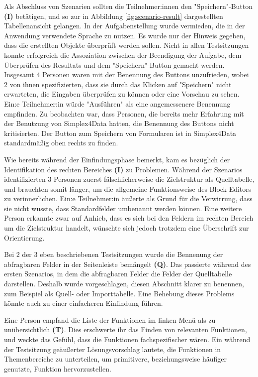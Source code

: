 Als Abschluss von Szenarien sollten die Teilnehmer:innen den "Speichern"-Button \textbf{(I)} betätigen, und so zur in Abbildung \ref{fig:scenario-result} dargestellten Tabellenansicht gelangen. In der Aufgabenstellung wurde vermieden, die in der Anwendung verwendete Sprache zu nutzen. Es wurde nur der Hinweis gegeben, dass die erstellten Objekte überprüft werden sollen. Nicht in allen Testsitzungen konnte erfolgreich die Assoziation zwischen der Beendigung der Aufgabe, dem Überprüfen des Resultats und dem "Speichern"-Button gemacht  werden. Insgesamt 4 Personen waren mit der Benennung des Buttons unzufrieden, wobei 2 von ihnen spezifizierten, dass sie durch das Klicken auf "Speichern" nicht erwarteten, die Eingaben überprüfen zu können oder eine Vorschau zu sehen. Ein:e Teilnehmer:in würde "Ausführen" als eine angemessenere Benennung empfinden. Zu beobachten war, dass Personen, die bereits mehr Erfahrung mit der Benutzung von Simplex4Data hatten, die Benennung des Buttons nicht kritisierten. Der Button zum Speichern von Formularen ist in Simplex4Data standardmäßig oben rechts zu finden.

Wie bereits während der Einfindungsphase bemerkt, kam es bezüglich der Identifikation des rechten Bereiches \textbf{(I)} zu Problemen. Während der Szenarios identifizierten 3 Personen zuerst fälschlicherweise die Zielstruktur als Quelltabelle, und brauchten somit länger, um die allgemeine Funktionsweise des Block-Editors zu verinnerlichen. Ein:e Teilnehmer:in äußerte als Grund für die Verwirrung, dass sie nicht wusste, dass Standardfelder umbenannt werden können. Eine weitere Person erkannte zwar auf Anhieb, dass es sich bei den Feldern im rechten Bereich um die Zielstruktur handelt, wünschte sich jedoch trotzdem eine Überschrift zur Orientierung.

Bei 2 der 3 eben beschriebenen Testsitzungen wurde die Bennenung der abfragbaren Felder in der Seitenleiste bemängelt \textbf{(Q)}. Das passierte während des ersten Szenarios, in dem die abfragbaren Felder die Felder der Quelltabelle darstellen. Deshalb wurde vorgeschlagen, diesen Abschnitt klarer zu benennen, zum Beispiel als Quell- oder Importtabelle. Eine Behebung dieses Problems könnte auch zu einer einfacheren Einfindung führen.

Eine Person empfand die Liste der Funktionen im linken Menü als zu unübersichtlich \textbf{(T)}. Dies erschwerte ihr das Finden von relevanten Funktionen, und weckte das Gefühl, dass die Funktionen fachspezifischer wären. Ein während der Testsitzung geäußerter Lösungsvorschlag lautete, die Funktionen in Themenbereiche zu unterteilen, um primitivere, beziehungsweise häufiger genutzte, Funktion hervorzustellen.

